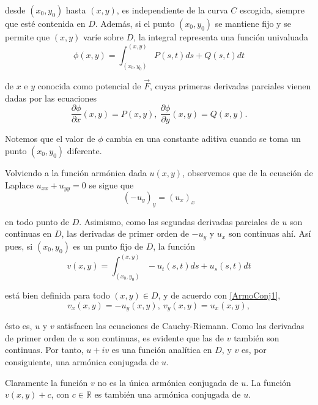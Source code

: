 desde $(x_0,y_0)$ hasta $(x,y)$, es independiente de la curva $C$ escogida, siempre que esté contenida en $D$. Además, si el punto $(x_0,y_0)$ se mantiene fijo y se permite que $(x,y)$ varíe sobre $D$, la integral representa una función univaluada
$$\phi(x,y) = \int_{(x_0,y_0)}^{(x,y)} P(s,t) ds + Q(s,t) dt$$

de $x$ e $y$ conocida como potencial de $\Vec{F}$, cuyas primeras derivadas parciales vienen dadas por las ecuaciones
\begin{equation}
  \frac{\partial \phi}{\partial x}(x,y) = P(x,y), ~ \frac{\partial \phi}{\partial y}(x,y) = Q(x,y).  \label{ArmoConj1}
\end{equation}

Notemos que el valor de $\phi$ cambia en una constante aditiva cuando se toma un punto $(x_0,y_0)$ diferente.

Volviendo a la función armónica dada $u(x,y)$, observemos que de la ecuación de Laplace $u_{xx} + u_{yy} = 0$ se sigue que
$$(-u_y)_y = (u_x)_x$$

en todo punto de $D$. Asimismo, como las segundas derivadas parciales de $u$ son continuas en $D$, las derivadas de primer orden de $-u_y$ y $u_x$ son continuas ahí. Así pues, si $(x_0,y_0)$ es un punto fijo de $D$, la función
$$v(x,y) = \int_{(x_0,y_0)}^{(x,y)} - u_t(s,t) ds + u_s(s,t) dt$$

está bien definida para todo $(x,y) \in D$, y de acuerdo con \eqref{ArmoConj1},
$$v_x(x,y) = - u_y(x,y),~ v_y(x,y) = u_x(x,y),$$

ésto es, $u$ y $v$ satisfacen las ecuaciones de Cauchy-Riemann. Como las derivadas de primer orden de $u$ son continuas, es evidente que las de $v$ también son continuas. Por tanto, $u+iv$ es una función analítica en $D$, y $v$ es, por consiguiente, una armónica conjugada de $u$. 

Claramente la función $v$ no es la única armónica conjugada de $u$. La función $v(x,y) + c$, con $c\in \mathbb{R}$ es también una armónica conjugada de $u$.